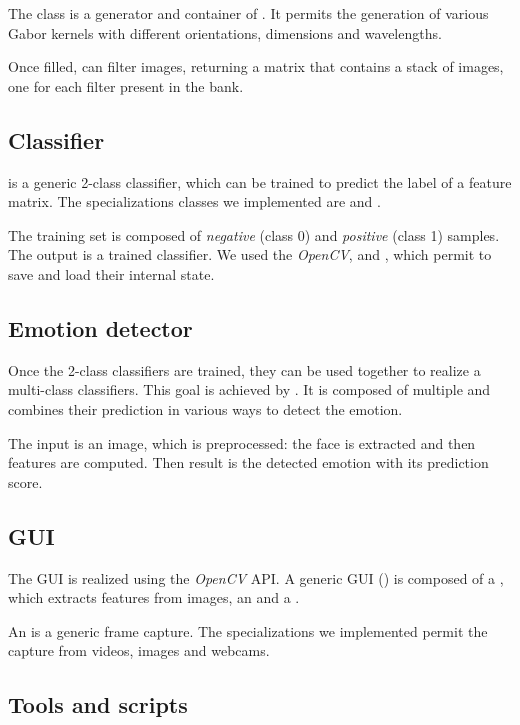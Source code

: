 The class  is a generator and container of .
It permits the generation of various Gabor kernels with different orientations,
dimensions and wavelengths.

Once filled,  can filter images, returning a matrix that
contains a stack of images, one for each filter present in the bank.

\subsection{Classifier}

 is a generic 2-class classifier, which can be trained to
predict the label of a feature matrix. The specializations classes we implemented are
 and .

The training set is composed of \emph{negative} (class 0) and \emph{positive}
(class 1) samples. The output is a trained classifier. We used the
\emph{OpenCV},  and , which permit to save and load
their internal state.

\subsection{Emotion detector}

Once the 2-class classifiers are trained, they can be used together to realize
a multi-class classifiers. This goal is achieved by . It is
composed of multiple  and combines their prediction in various
ways to detect the emotion.

The input is an image, which is preprocessed: the face is extracted and then
features are computed. Then result is the detected emotion with its prediction
score.

\subsection{GUI}

The GUI is realized using the \emph{OpenCV} API. A generic GUI () is
composed of a , which extracts features from images, an
 and a .

An  is a generic frame capture. The specializations we
implemented permit the capture from videos, images and webcams.

\subsection{Tools and scripts}

